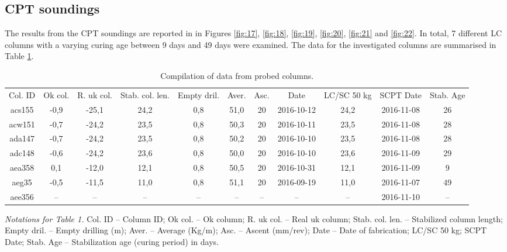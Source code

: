 \documentclass[final,3p,times,twocolumn]{elsarticle}
\begin{document}
\subsection{CPT soundings}

The results from the CPT soundings are reported in in Figures \ref{fig:17}, \ref{fig:18}, \ref{fig:19}, \ref{fig:20}, \ref{fig:21} and \ref{fig:22}. In total, 7 different LC columns with a varying curing age between 9 days and 49 days were examined. The data for the investigated columns are summarised in Table \ref{tab:1}.

\begin{table}[t]
\begin{threeparttable}
   \caption{Compilation of data from probed columns.}
  \centering
  \footnotesize
  \begin{tabular}{| c c c c c c c c c c c |}
    Col. ID & Ok col. & R. uk col. & Stab. col. len. & Empty dril. & Aver. & Asc. & Date & LC/SC 50 kg & SCPT Date & Stab. Age \\
    acs155 & -0,9 & -25,1 & 24,2 & 0,8 & 51,0 & 20 & 2016-10-12 & 24,2 & 2016-11-08 & 26 \\
    acw151 & -0,7 & -24,2 & 23,5 & 0,8 & 50,3 & 20 & 2016-10-11 & 23,5 & 2016-11-08 & 28 \\
    ada147 & -0,7 & -24,2 & 23,5 & 0,8 & 50,2 & 20 & 2016-10-10 & 23,5 & 2016-11-08 & 28 \\
    adc148 & -0,6 & -24,2 & 23,6 & 0,8 & 50,0 & 20 & 2016-10-10 & 23,6 & 2016-11-09 & 29 \\
    aea358 & 0,1 & -12,0 & 12,1 & 0,8 & 50,5 & 20 & 2016-10-31 & 12,1 & 2016-11-09 & 9 \\
    aeg35 & -0,5 & -11,5 & 11,0 & 0,8 & 51,1 & 20 & 2016-09-19 & 11,0 & 2016-11-07 & 49 \\
    aee356 & -- & -- & -- & -- & -- & -- & -- & -- & 2016-11-10 & --
  \end{tabular}
  \label{tab:1}
   \begin{tablenotes}
      \footnotesize
      	\item \emph{Notations for Table 1.} Col. ID -- Column ID; Ok col. -- Ok column; R. uk col. -- Real uk column; Stab. col. len. -- Stabilized column length; Empty dril. -- Empty drilling (m); Aver. -- Average (Kg/m); Asc. -- Ascent (mm/rev); Date -- Date of fabrication; LC/SC 50 kg; SCPT Date; Stab. Age -- Stabilization age (curing period) in days.
    \end{tablenotes}
  \end{threeparttable}
\end{table}
\end{document}
